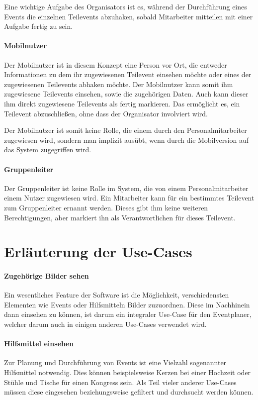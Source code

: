 Eine wichtige Aufgabe des Organisators ist es, während der Durchführung eines Events die einzelnen Teilevents abzuhaken, sobald Mitarbeiter mitteilen mit einer Aufgabe fertig zu sein.

\paragraph{Mobilnutzer}
Der Mobilnutzer ist in diesem Konzept eine Person vor Ort, die entweder Informationen zu dem ihr zugewiesenen Teilevent einsehen möchte oder eines der zugewiesenen Teilevents abhaken möchte. Der Mobilnutzer kann somit ihm zugewiesene Teilevents einsehen, sowie die zugehörigen Daten. Auch kann dieser ihm direkt zugewiesene Teilevents als fertig markieren. Das ermöglicht es, ein Teilevent abzuschließen, ohne dass der Organisator involviert wird.

Der Mobilnutzer ist somit keine Rolle, die einem durch den Personalmitarbeiter zugewiesen wird, sondern man implizit ausübt, wenn durch die Mobilversion auf das System zugegriffen wird.

\paragraph{Gruppenleiter}
Der Gruppenleiter ist keine Rolle im System, die von einem Personalmitarbeiter einem Nutzer zugewiesen wird. Ein Mitarbeiter kann für ein bestimmtes Teilevent zum Gruppenleiter ernannt werden. Dieses gibt ihm keine weiteren Berechtigungen, aber markiert ihn als Verantwortlichen für dieses Teilevent.

\section{Erläuterung der Use-Cases}

\paragraph{Zugehörige Bilder sehen}
Ein wesentliches Feature der Software ist die Möglichkeit, verschiedensten Elementen wie Events oder Hilfsmitteln Bilder zuzuordnen. Diese im Nachhinein dann einsehen zu können, ist darum ein integraler Use-Case für den Eventplaner, welcher darum auch in einigen anderen Use-Cases verwendet wird.

\paragraph{Hilfsmittel einsehen}
Zur Planung und Durchführung von Events ist eine Vielzahl sogenannter Hilfsmittel notwendig. Dies können beispielsweise Kerzen bei einer Hochzeit oder Stühle und Tische für einen Kongress sein. Als Teil vieler anderer Use-Cases müssen diese eingesehen beziehungsweise gefiltert und durchsucht werden können.

